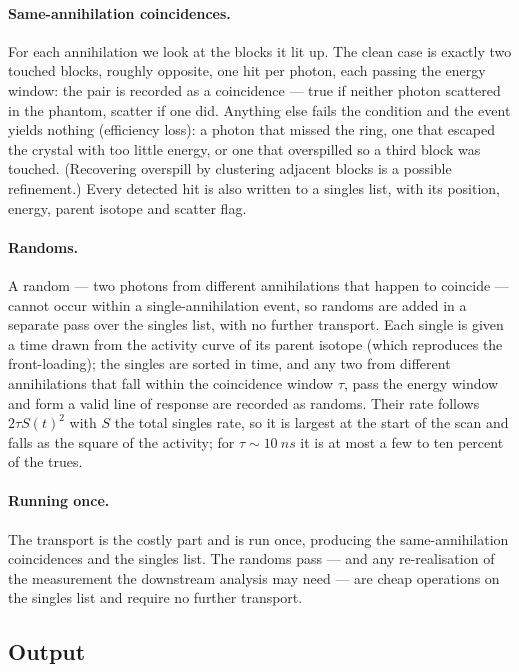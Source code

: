 \documentclass[11pt]{article}
\begin{document}
\paragraph{Same-annihilation coincidences.}
For each annihilation we look at the blocks it lit up. The clean case is exactly two
touched blocks, roughly opposite, one hit per photon, each passing the energy window: the
pair is recorded as a coincidence --- true if neither photon scattered in the phantom,
scatter if one did. Anything else fails the condition and the event yields nothing
(efficiency loss): a photon that missed the ring, one that escaped the crystal with too
little energy, or one that overspilled so a third block was touched. (Recovering overspill
by clustering adjacent blocks is a possible refinement.) Every detected hit is also written
to a singles list, with its position, energy, parent isotope and scatter flag.

\paragraph{Randoms.}
A random --- two photons from different annihilations that happen to coincide --- cannot
occur within a single-annihilation event, so randoms are added in a separate pass over
the singles list, with no further transport. Each single is given a time drawn from the
activity curve of its parent isotope (which reproduces the front-loading); the singles
are sorted in time, and any two from different annihilations that fall within the
coincidence window $\tau$, pass the energy window and form a valid line of response are
recorded as randoms. Their rate follows $2\tau S(t)^2$ with $S$ the total singles rate,
so it is largest at the start of the scan and falls as the square of the activity; for
$\tau\sim\SI{10}{ns}$ it is at most a few to ten percent of the trues.

\paragraph{Running once.}
The transport is the costly part and is run once, producing the same-annihilation
coincidences and the singles list. The randoms pass --- and any re-realisation of the
measurement the downstream analysis may need --- are cheap operations on the singles
list and require no further transport.

\subsection{Output}
\label{sec:output}
\end{document}
